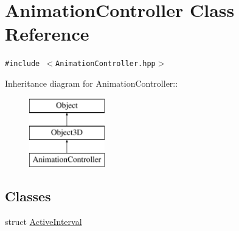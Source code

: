 \hypertarget{classm3g_1_1AnimationController}{
\section{AnimationController Class Reference}
\label{classm3g_1_1AnimationController}
}
{\tt \#include $<$AnimationController.hpp$>$}

Inheritance diagram for AnimationController::\begin{figure}[H]
\begin{center}
\leavevmode
\includegraphics[height=3cm]{classm3g_1_1AnimationController}
\end{center}
\end{figure}
\subsection*{Classes}
\begin{CompactItemize}
\item 
struct \hyperlink{structm3g_1_1AnimationController_1_1ActiveInterval}{ActiveInterval}
\end{CompactItemize}
